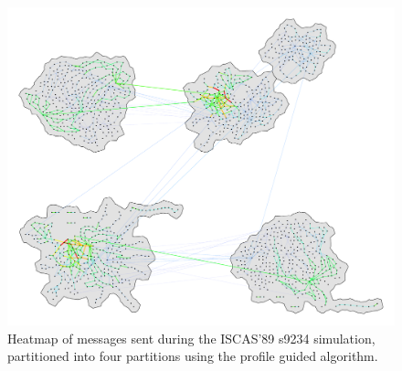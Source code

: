 \documentclass[11pt]{book}
\begin{document}
\begin{figure}
\centering
\includegraphics[width=\textwidth,height=0.9\textheight,keepaspectratio]{figs/s9234_4part}
\caption{Heatmap of messages sent during the ISCAS'89 s9234 simulation, partitioned into four partitions using the profile guided algorithm.}
\end{figure}
\end{document}
